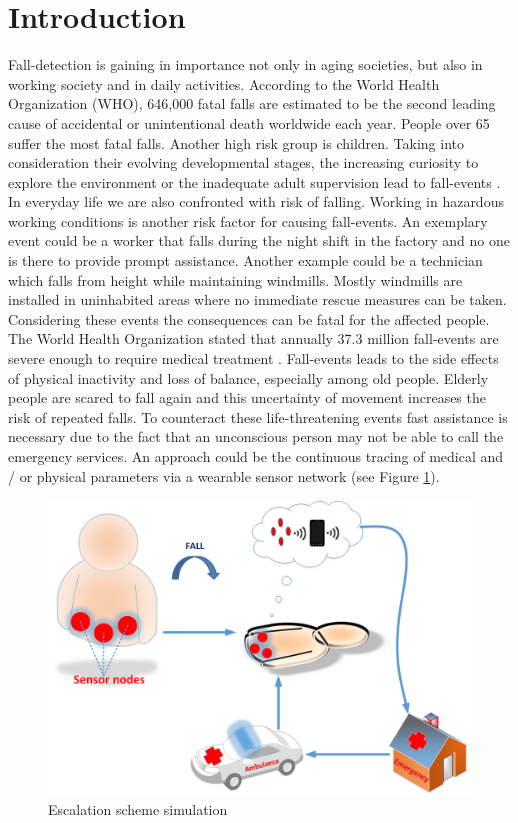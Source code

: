\documentclass[review]{elsarticle}
\begin{document}

\section{Introduction}
Fall-detection is gaining in importance not only in aging societies, but also in working society and in daily activities. According to the World Health Organization (WHO), 646,000 fatal falls are estimated to be the second leading cause of accidental or unintentional death worldwide each year. People over 65 suffer the most fatal falls. Another high risk group is children. Taking into consideration their evolving developmental stages, the increasing curiosity to explore the environment or the inadequate adult supervision lead to fall-events \cite{WHO2018}.
In everyday life we are also confronted with risk of falling. Working in hazardous working conditions is another risk factor for causing fall-events. An exemplary event could be a worker that falls during the night shift in the factory and no one is there to provide prompt assistance. Another example could be a technician which falls from height while maintaining windmills. Mostly windmills are installed in uninhabited areas where no immediate rescue measures can be taken. Considering these events the consequences can be fatal for the affected people. 
The World Health Organization stated that annually 37.3 million fall-events are severe enough to require medical treatment \cite{WHO2018}. Fall-events leads to the side effects of physical inactivity and loss of balance, especially among old people. Elderly people are scared to fall again and this uncertainty of movement increases the risk of repeated falls. 
To counteract these life-threatening events fast assistance is necessary due to the fact that an unconscious person may not be able to call the emergency services. An approach could be the continuous tracing of medical and / or physical parameters via a wearable sensor network (see Figure \ref{fig:escalationscheme}).
\begin{figure}[!ht]
	\centering
	\includegraphics[scale=0.35]{Images/EscalationScheme}
	\caption[Escalation scheme]{Escalation scheme simulation~\cite{LaBlunda.2016,LaBlunda.2016b}}
	\label{fig:escalationscheme}
\end{figure}
\end{document}

